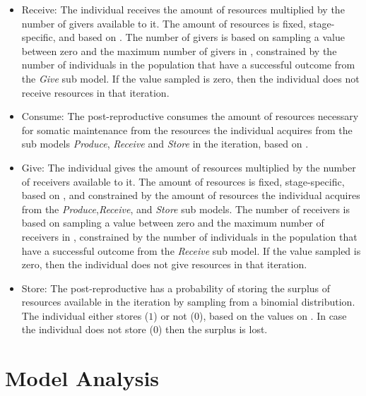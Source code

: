\documentclass{article}
\begin{document}
\begin{itemize}
\begin{itemize}
        \item Receive: The individual receives the amount of resources multiplied by the number of givers available to it. The amount of resources is fixed, stage-specific, and based on \cite{gurven2004give}. The number of givers is based on sampling a value between zero and the maximum number of givers in \cite{gurven2004give}, constrained by the number of individuals in the population that have a successful outcome from the \emph{Give} sub model. If the value sampled is zero, then the individual does not receive resources in that iteration.
        \item Consume: The post-reproductive consumes the amount of resources necessary for somatic maintenance from the resources the individual acquires from the sub models \emph{Produce}, \emph{Receive} and \emph{Store} in the iteration, based on \cite{kaplan2000theory, pontzer2021daily}.
        \item Give: The individual gives the amount of resources multiplied by the number of receivers available to it. The amount of resources is fixed, stage-specific, based on \cite{gurven2004give}, and constrained by the amount of resources the individual acquires from the \emph{Produce},\emph{Receive}, and \emph{Store} sub models. The number of receivers is based on sampling a value between zero and the maximum number of receivers in \cite{gurven2004give}, constrained by the number of individuals in the population that have a successful outcome from the \emph{Receive} sub model. If the value sampled is zero, then the individual does not give resources in that iteration.
        \item Store: The post-reproductive has a probability of storing the surplus of resources available in the iteration by sampling from a binomial distribution. The individual either stores ($1$) or not ($0$), based on the values on \citep{bowles2011cultivation}. In case the individual does not store ($0$) then the surplus is lost.
    \end{itemize}
\end{itemize}

\section{Model Analysis}
\end{document}
